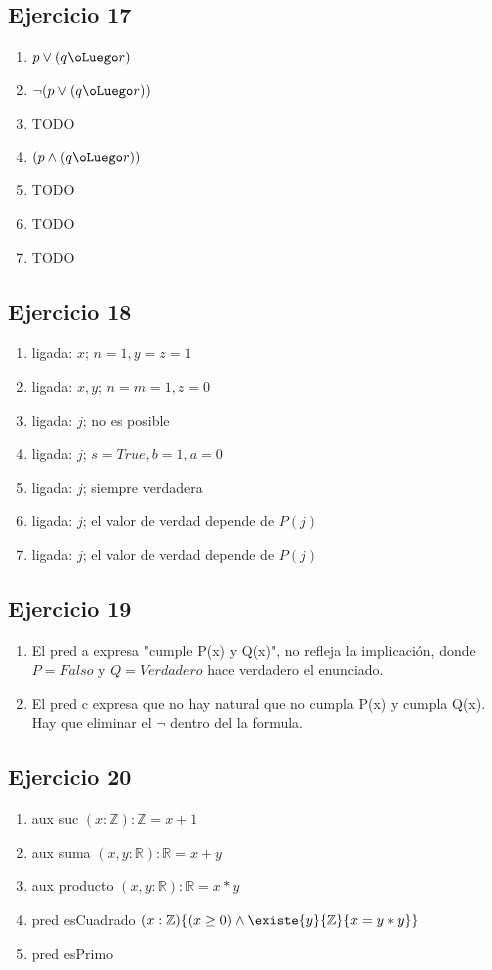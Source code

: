 \subsection{Ejercicio 17}
\begin{enumerate}[label=(\alph*)]
    \item $p \vee (q \oLuego r)$
    \item $\neg (p \vee (q \oLuego r))$
    \item TODO
    \item $(p \wedge (q \oLuego r))$
    \item TODO
    \item TODO
    \item TODO
\end{enumerate}

\subsection{Ejercicio 18}
\begin{enumerate}[label=(\alph*)]
    \item ligada: $x$; $n = 1, y = z = 1$
    \item ligada: $x, y$; $n = m = 1, z = 0$
    \item ligada: $j$; no es posible
    \item ligada: $j$; $s = True, b = 1, a = 0$
    \item ligada: $j$; siempre verdadera
    \item ligada: $j$; el valor de verdad depende de $P(j)$
    \item ligada: $j$; el valor de verdad depende de $P(j)$
\end{enumerate}

\subsection{Ejercicio 19}
\begin{enumerate}
    \item El pred a expresa "cumple P(x) y Q(x)", no refleja la implicación, donde $P = Falso$ y $Q = Verdadero$ hace verdadero el enunciado.
    \item El pred c expresa que no hay natural que no cumpla P(x) y cumpla Q(x). Hay que eliminar el $\neg$ dentro del la formula.
\end{enumerate}

\subsection{Ejercicio 20}
\begin{enumerate}
    \item aux suc $(x:\mathbb{Z}):\mathbb{Z} = x + 1$
    \item aux suma $(x, y:\mathbb{R}):\mathbb{R} = x + y$
    \item aux producto $(x, y:\mathbb{R}):\mathbb{R} = x*y$
    \item pred esCuadrado $(x: \mathbb{Z}) \{ (x \geq 0) \wedge \existe{y}{\mathbb{Z}}{x = y*y}\}$
    \item pred esPrimo
\end{enumerate}


